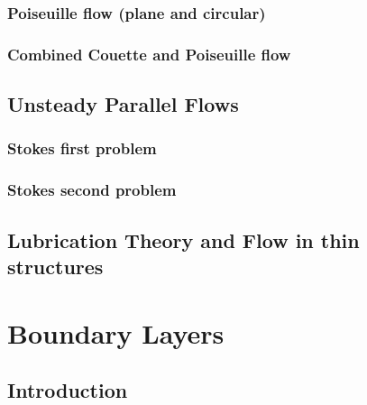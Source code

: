 \documentclass[oneside,a4paper,11pt]{report}
\begin{document}
\subsection{Poiseuille flow (plane and circular)}

\subsection{Combined Couette and Poiseuille flow}

\section{Unsteady Parallel Flows}

\subsection{Stokes first problem}

\subsection{Stokes second problem}

\section{Lubrication Theory and Flow in thin structures}

\chapter{Boundary Layers}

\section{Introduction}
\end{document}
